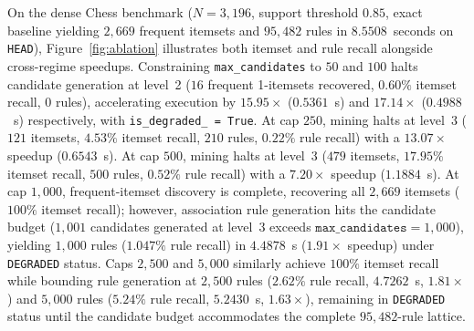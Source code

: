 \documentclass[twocolumn,10pt]{article}
\begin{document}
On the dense Chess benchmark ($N=3{,}196$, support threshold $0.85$, exact baseline yielding $2{,}669$ frequent itemsets and $95{,}482$ rules in $8.5508$~seconds on \texttt{HEAD}), Figure~\ref{fig:ablation} illustrates both itemset and rule recall alongside cross-regime speedups. Constraining \texttt{max\_candidates} to $50$ and $100$ halts candidate generation at level~2 ($16$ frequent 1-itemsets recovered, $0.60\%$ itemset recall, $0$ rules), accelerating execution by $15.95\times$ ($0.5361$~s) and $17.14\times$ ($0.4988$~s) respectively, with \texttt{is\_degraded\_ = True}. At cap $250$, mining halts at level~3 ($121$ itemsets, $4.53\%$ itemset recall, $210$ rules, $0.22\%$ rule recall) with a $13.07\times$ speedup ($0.6543$~s). At cap $500$, mining halts at level~3 ($479$ itemsets, $17.95\%$ itemset recall, $500$ rules, $0.52\%$ rule recall) with a $7.20\times$ speedup ($1.1884$~s). At cap $1{,}000$, frequent-itemset discovery is complete, recovering all $2{,}669$ itemsets ($100\%$ itemset recall); however, association rule generation hits the candidate budget ($1{,}001$ candidates generated at level~3 exceeds $\texttt{max\_candidates}=1{,}000$), yielding $1{,}000$ rules ($1.047\%$ rule recall) in $4.4878$~s ($1.91\times$ speedup) under \texttt{DEGRADED} status. Caps $2{,}500$ and $5{,}000$ similarly achieve $100\%$ itemset recall while bounding rule generation at $2{,}500$ rules ($2.62\%$ rule recall, $4.7262$~s, $1.81\times$) and $5{,}000$ rules ($5.24\%$ rule recall, $5.2430$~s, $1.63\times$), remaining in \texttt{DEGRADED} status until the candidate budget accommodates the complete $95{,}482$-rule lattice.
\end{document}
